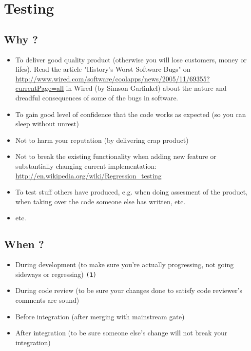 
\section{Testing}

\subsection{Why ?}
\begin{itemize}
  \item To deliver good quality product (otherwise you will lose
  customers, money or lifes). Read the article "History's Worst
  Software Bugs" on
  \url{http://www.wired.com/software/coolapps/news/2005/11/69355?currentPage=all}
  in Wired (by Simson Garfinkel) about the nature and dreadful consequences of
  some of the bugs in software.
  \item To gain good level of confidence that the code works as expected
  (so you can sleep without unrest)
  \item Not to harm your reputation (by delivering crap product)
  \item Not to break the existing functionality when adding new feature
    or substantially changing current implementation:
  \url{http://en.wikipedia.org/wiki/Regression\_testing}
  \item To test stuff others have produced, e.g. when doing assesment
  of the product, when taking over the code someone else has written, etc.
  \item etc.
\end{itemize}

\subsection{When ?}
\begin{itemize}
  \item During development (to make sure you're actually progressing,
  not going sideways or regressing) \texttt{(1)}
  \item During code review (to be sure your changes done to satisfy code
  reviewer's comments are sound)
  \item Before integration (after merging with mainstream gate)
  \item After integration (to be sure someone else's change
  will not break your integration)
\end{itemize}

